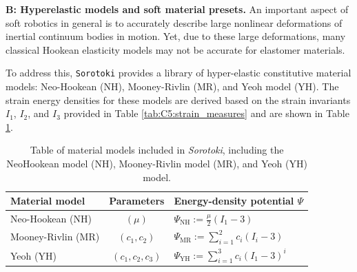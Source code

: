 \textbf{B: Hyperelastic models and soft material presets.} An important aspect of soft robotics in general is to accurately describe large nonlinear deformations of inertial continuum bodies in motion. Yet, due to these large deformations, many classical Hookean elasticity models may not be accurate for elastomer materials. 

To address this, \texttt{Sorotoki} provides a library of hyper-elastic constitutive material models: Neo-Hookean (NH), Mooney-Rivlin (MR), and Yeoh model (YH). The strain energy densities for these models are derived based on the strain invariants $I_1$, $I_2$, and $I_3$ provided in Table \ref{tab:C5:strain_measures} and are shown in Table \ref{tab:C5:elasticitymodels}.
%
\begin{table}[t]
    \renewcommand\arraystretch{1.25}
    \setlength{\tabcolsep}{2.25pt}
    \centering
    \caption{\small Table of material models included in \textit{Sorotoki}, including the NeoHookean model (NH), Mooney-Rivlin model (MR), and Yeoh (YH) model.}
    \label{tab:C5:elasticitymodels}
    \begin{tabular}{lcl}
        \hline
        Material model     & \;\;Parameters\;\; & \quad \;\; Energy-density potential $\Psi$                                     \\
        \hline \hline
        Neo-Hookean (NH)   & $(\mu)$            & \quad \;\; $\Psi_{\textrm{NH}} := \frac{\mu}{2} \left(I_1 - 3 \right)$         \\
        Mooney-Rivlin (MR) & $(c_1,c_2)$        & \quad \;\; $\Psi_{\textrm{MR}} := \sum^{2}_{i=1} c_i \left(I_i - 3 \right)$    \\
        Yeoh (YH)          & $(c_1,c_2,c_3)$    & \quad \;\; $\Psi_{\textrm{YH}}  := \sum^{3}_{i=1} c_i \left(I_1 - 3 \right)^i$ \\
        \hline
    \end{tabular}
\end{table}
%
